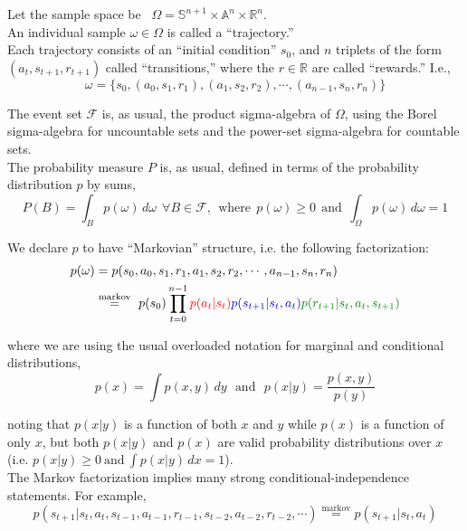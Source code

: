 Let the sample space be \ $\Omega = \mathbb{S}^{n+1} \times \mathbb{A}^n \times \mathbb{R}^n$.\\
An individual sample $\omega \in \Omega$ is called a ``trajectory.''\\

Each trajectory consists of an ``initial condition'' $s_0$, and $n$ triplets of the form $(a_t, s_{t+1}, r_{t+1})$ called ``transitions,'' where the $r \in \mathbb{R}$ are called ``rewards.'' I.e.,
\begin{equation*}
\omega = \{s_0, (a_0, s_1, r_1), (a_1, s_2, r_2), \cdots, (a_{n-1}, s_{n}, r_n)\}
\end{equation*}

The event set $\mathcal{F}$ is, as usual, the product sigma-algebra of $\Omega$, using the Borel sigma-algebra for uncountable sets and the power-set sigma-algebra for countable sets.\\

The probability measure $P$ is, as usual, defined in terms of the probability distribution $p$ by sums,
\begin{equation*}
P(B) = \int_B p(\omega)\, d\omega\ \ \forall B \in \mathcal{F},\ \ \text{where}\ \ p(\omega)\geq0\ \ \text{and}\ \ \int_\Omega p(\omega)\,d\omega = 1
\end{equation*}

We declare $p$ to have ``Markovian'' structure, i.e. the following factorization:
\begin{align*}
p(\omega) &= p(s_0, a_0, s_1, r_1, a_1, s_2, r_2, \cdots, a_{n-1}, s_{n}, r_n)\\
&\stackrel{\text{markov}}{=}\ p(s_0) \prod_{t=0}^{n-1} \red{p(a_t|s_t)}\blue{p(s_{t+1}|s_t,a_t)}\green{p(r_{t+1}|s_t,a_t,s_{t+1})}
\end{align*}

where we are using the usual overloaded notation for marginal and conditional distributions,\\
\begin{equation*}
p(x) = \int p(x,y)\,dy\ \ \ \text{and}\ \ \ p(x|y) = \frac{p(x,y)}{p(y)}
\end{equation*}

noting that $p(x|y)$ is a function of both $x$ and $y$ while $p(x)$ is a function of only $x$, but both $p(x|y)$ and $p(x)$ are valid probability distributions over $x$ (i.e. $p(x|y)\geq0\ \text{and}\ \int p(x|y)\,dx = 1$).\\

The Markov factorization implies many strong conditional-independence statements. For example,
\begin{equation*}
p(s_{t+1}|s_t,a_t,s_{t-1},a_{t-1},r_{t-1},s_{t-2},a_{t-2},r_{t-2},\cdots) \stackrel{\text{markov}}{=} p(s_{t+1}|s_t,a_t)
\end{equation*}

